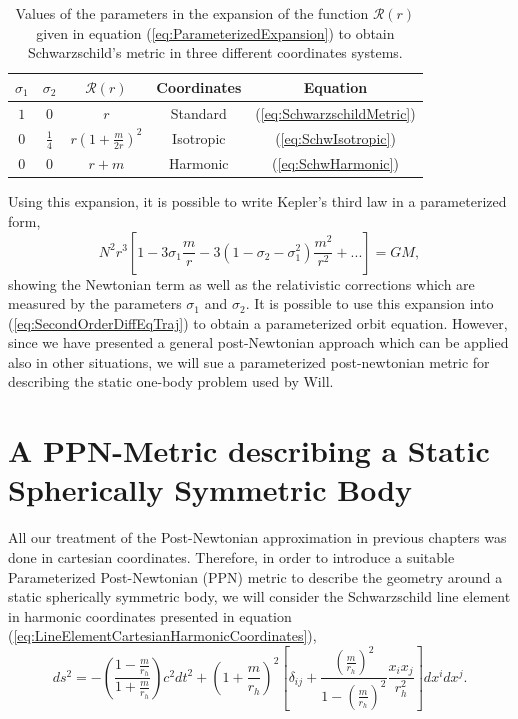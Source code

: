 \begin{table}[h]
\centering
\footnotesize
\begin{tabular}{|c|c|c|c|c|}
\hline
$\sigma_1$ & $\sigma_2$ &$ \mathcal{R}(r)$ & Coordinates & Equation \\
\hline
$1$ & $0$ &$r$ & Standard & (\ref{eq:SchwarzschildMetric}) \\
$0$ & $\frac{1}{4}$ &$r\left(1 + \frac{m}{2r} \right)^2$ & Isotropic & (\ref{eq:SchwIsotropic}) \\
$0$ & $0$ &$r+m$ & Harmonic & (\ref{eq:SchwHarmonic})\\
\hline
\end{tabular}
\caption{Values of the parameters in the expansion of the function $\mathcal{R}(r)$ given in equation (\ref{eq:ParameterizedExpansion}) to obtain Schwarzschild's metric in three different coordinates systems.}
\label{tab:SchwarzschildFormsParam}
\end{table}

Using this expansion, it is possible to write Kepler's third law in a parameterized form,
\begin{equation}
N^2 r^3 \left[ 1 - 3\sigma_1 \frac{m}{r} - 3(1-\sigma_2 - \sigma_1^2) \frac{m^2}{r^2} + ... \right]= GM,
\end{equation}
showing the Newtonian term as well as the relativistic corrections which are measured by the parameters $\sigma_1$ and $\sigma_2$. It is possible to use this expansion into (\ref{eq:SecondOrderDiffEqTraj}) to obtain a parameterized orbit equation. However, since we have presented a general post-Newtonian approach which can be applied also in other situations, we will sue a parameterized post-newtonian metric for describing the static one-body problem used by Will\cite{Will1993}.


\section{A  PPN-Metric describing a Static Spherically Symmetric Body}

All our treatment of the Post-Newtonian approximation in previous chapters was done in cartesian coordinates. Therefore, in order to introduce a suitable Parameterized Post-Newtonian (PPN) metric to describe the geometry around a static spherically symmetric body, we will consider the Schwarzschild line element in harmonic coordinates presented in equation (\ref{eq:LineElementCartesianHarmonicCoordinates}),
 \begin{equation}
 ds^2 = - \left( \frac{1-\frac{m}{r_h}}{1+\frac{m}{r_h}}\right) c^2 dt^2 + \left( 1 + \frac{m}{r_h}\right)^2  \left[ \delta_{ij} + \frac{\left(\frac{m}{r_h}\right)^2}{1-\left(\frac{m}{r_h}\right)^2} \frac{x_i x_j}{r_h^2}  \right] dx^i dx^j .
 \end{equation}

